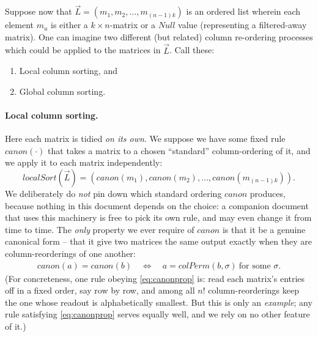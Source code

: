 \documentclass{article}
\begin{document}
Suppose now that $\vec L=(m_1, m_2, \ldots, m_{(n-1)k})$ is an ordered list wherein
each element $m_u$ is either a $k\times n$-matrix or a $Null$ value (representing a
filtered-away matrix).  One can imagine two different (but related) column
re-ordering processes which could be applied to the matrices in $\vec L$.  Call
these:
\begin{enumerate}
\item
Local column sorting, and
\item
Global column sorting.
\end{enumerate}

\paragraph{Local column sorting.}
Here each matrix is tidied \emph{on its own}.  We suppose we have some fixed rule
$canon(\cdot)$ that takes a matrix to a chosen ``standard'' column-ordering of it,
and we apply it to each matrix independently:
$$localSort(\vec L) = \left(
canon(m_1), canon(m_2), \ldots, canon(m_{(n-1)k})
\right).
$$
We deliberately do \emph{not} pin down which standard ordering $canon$ produces,
because nothing in this document depends on the choice: a companion document that
uses this machinery is free to pick its own rule, and may even change it from time
to time.  The \emph{only} property we ever require of $canon$ is that it be a
genuine canonical form -- that it give two matrices the same output exactly when
they are column-reorderings of one another:
\begin{align}
canon(a)=canon(b)
\quad\iff\quad
a=colPerm(b,\sigma)\ \text{for some }\sigma.
\label{eq:canonprop}
\end{align}
(For concreteness, one rule obeying \eqref{eq:canonprop} is: read each matrix's
entries off in a fixed order, say row by row, and among all $n!$ column-reorderings
keep the one whose readout is alphabetically smallest.  But this is only an
\emph{example}; any rule satisfying \eqref{eq:canonprop} serves equally well, and we
rely on no other feature of it.)
\end{document}
